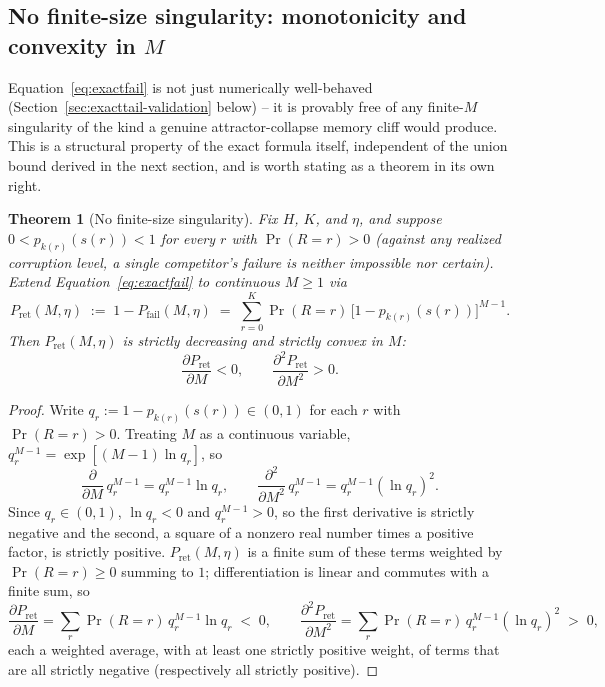 \documentclass[11pt]{article}
\newtheorem{theorem}{Theorem}
\begin{document}
\subsection{No finite-size singularity: monotonicity and convexity in $M$}
\label{sec:smoothness}

Equation~\ref{eq:exactfail} is not just numerically well-behaved (Section~\ref{sec:exacttail-validation}
below) -- it is provably free of any finite-$M$ singularity of the kind a genuine attractor-collapse
memory cliff would produce. This is a structural property of the exact formula itself, independent of
the union bound derived in the next section, and is worth stating as a theorem in its own right.

\begin{theorem}[No finite-size singularity]
\label{thm:smoothness}
Fix $H$, $K$, and $\eta$, and suppose $0 < p_{k(r)}(s(r)) < 1$ for every $r$ with $\Pr(R=r)>0$ (against
any realized corruption level, a single competitor's failure is neither impossible nor certain).
Extend Equation~\ref{eq:exactfail} to continuous $M \ge 1$ via
\[
P_{\mathrm{ret}}(M,\eta) \;:=\; 1 - P_{\mathrm{fail}}(M,\eta) \;=\; \sum_{r=0}^{K} \Pr(R=r)\,
\big[1-p_{k(r)}(s(r))\big]^{M-1}.
\]
Then $P_{\mathrm{ret}}(M,\eta)$ is strictly decreasing and strictly convex in $M$:
\[
\frac{\partial P_{\mathrm{ret}}}{\partial M} < 0, \qquad \frac{\partial^2 P_{\mathrm{ret}}}{\partial M^2} > 0.
\]
\end{theorem}

\begin{proof}
Write $q_r := 1-p_{k(r)}(s(r)) \in (0,1)$ for each $r$ with $\Pr(R=r)>0$. Treating $M$ as a continuous
variable, $q_r^{M-1} = \exp[(M-1)\ln q_r]$, so
\[
\frac{\partial}{\partial M}\,q_r^{M-1} = q_r^{M-1}\ln q_r,
\qquad
\frac{\partial^2}{\partial M^2}\,q_r^{M-1} = q_r^{M-1}(\ln q_r)^2.
\]
Since $q_r \in (0,1)$, $\ln q_r < 0$ and $q_r^{M-1}>0$, so the first derivative is strictly negative
and the second, a square of a nonzero real number times a positive factor, is strictly positive.
$P_{\mathrm{ret}}(M,\eta)$ is a finite sum of these terms weighted by $\Pr(R=r)\ge0$ summing to $1$;
differentiation is linear and commutes with a finite sum, so
\[
\frac{\partial P_{\mathrm{ret}}}{\partial M} = \sum_{r} \Pr(R=r)\,q_r^{M-1}\ln q_r \;<\; 0,
\qquad
\frac{\partial^2 P_{\mathrm{ret}}}{\partial M^2} = \sum_{r} \Pr(R=r)\,q_r^{M-1}(\ln q_r)^2 \;>\; 0,
\]
each a weighted average, with at least one strictly positive weight, of terms that are all strictly
negative (respectively all strictly positive).
\end{proof}
\end{document}
